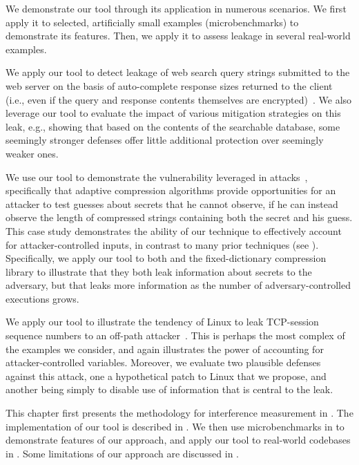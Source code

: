 We demonstrate our tool through its application in numerous scenarios.
We first apply it to selected, artificially small examples
(microbenchmarks) to demonstrate its features.  Then, we apply it to
assess leakage in several real-world examples.
\begin{compactitem}
\item We apply our tool to detect leakage of web search query strings
  submitted to the \sphinx web server on the basis of auto-complete
  response sizes returned to the client (i.e., even if the query and
  response contents themselves are encrypted)~\cite{webTomorrow:sp10}.
  We also leverage our tool to evaluate the impact of various
  mitigation strategies on this leak, e.g., showing that based on the
  contents of the searchable database, some seemingly stronger
  defenses offer little additional protection over seemingly weaker
  ones.
\item We use our tool to demonstrate the vulnerability leveraged in
  \crime attacks~\cite{Kelsey:2002:CIL:647937.741226}, specifically
  that adaptive compression algorithms provide opportunities for an
  attacker to test guesses about secrets that he cannot observe, if he
  can instead observe the length of compressed strings containing both
  the secret and his guess.  This case study demonstrates the ability
  of our technique to effectively account for attacker-controlled
  inputs, in contrast to many prior techniques (see
  ).  Specifically, we apply our tool to both
  \gzip and the fixed-dictionary compression library \smaz to
  illustrate that they both leak information about secrets to the
  adversary, but that \gzip leaks more information as the number of
  adversary-controlled executions grows.

\item We apply our tool to illustrate the tendency of Linux to leak
  TCP-session sequence numbers to an off-path
  attacker~\cite{tcp:1985,Qian:2012:CTS}.  This is perhaps the most
  complex of the examples we consider, and again illustrates the power
  of accounting for attacker-controlled variables.  Moreover, we
  evaluate two plausible defenses against this attack, one a
  hypothetical patch to Linux that we propose, and another being
  simply to disable use of information that is central to the leak.
\end{compactitem}

This chapter first presents the methodology for interference
measurement in .  The implementation of our
tool is described in .  We then use microbenchmarks
in  to demonstrate features of our approach, and
apply our tool to real-world codebases in .
Some limitations of our approach are discussed in
.

